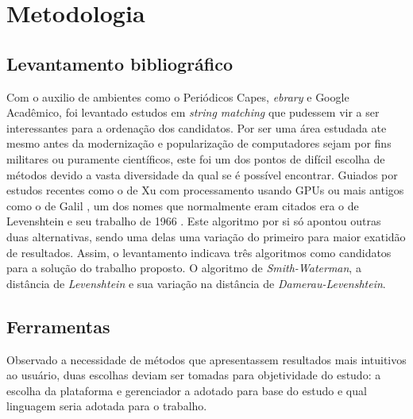 \chapter{\nmu Metodologia} %
\label{cha:metodologia}


\section{Levantamento bibliográfico} %
\label{sec:levantamento_bibliogr_fico}

Com o auxilio de ambientes como o Periódicos Capes, \textit{ebrary} e Google Acadêmico, foi levantado estudos em \textit{string matching} que pudessem vir a ser interessantes para a ordenação dos candidatos.  Por ser uma área estudada ate mesmo antes da modernização e popularização de computadores sejam por fins militares ou puramente científicos, este foi um dos pontos de difícil escolha de métodos devido a vasta diversidade da qual se é possível encontrar. Guiados por estudos recentes como o de Xu \cite{xu2013bit} com processamento usando GPUs ou mais antigos como o de Galil \cite{galil1988data}, um dos nomes que normalmente eram citados era o de Levenshtein e seu trabalho de 1966 \cite{levenshtein1966}. Este algoritmo por si só apontou outras duas alternativas, sendo uma delas uma variação do primeiro para maior exatidão de resultados. Assim, o levantamento indicava três algoritmos como candidatos para a solução do trabalho proposto. O algoritmo de \textit{Smith-Waterman}, a distância de \textit{Levenshtein} e sua variação na distância de \textit{Damerau-Levenshtein}.



\section{Ferramentas} %
\label{sec:codifica_o}

Observado a necessidade de métodos que apresentassem resultados mais intuitivos ao usuário, duas escolhas deviam ser tomadas para objetividade do estudo: a escolha da plataforma e gerenciador a adotado para base do estudo e qual linguagem seria adotada para o trabalho.

